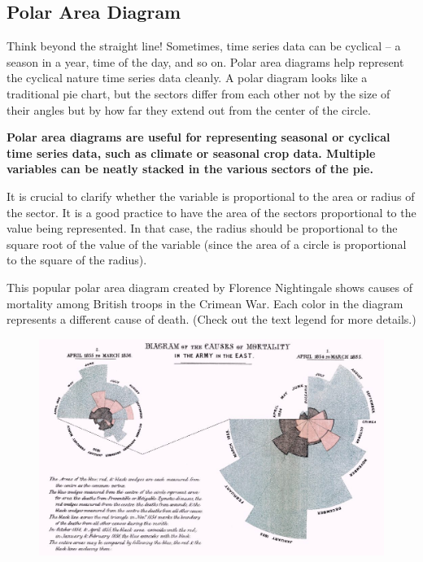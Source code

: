 \documentclass[]{book}
\theoremstyle{definition}
\theoremstyle{definition}
\theoremstyle{definition}
\theoremstyle{remark}
\begin{document}
\subsection{Polar Area Diagram}\label{polar-area-diagram}

Think beyond the straight line! Sometimes, time series data can be
cyclical -- a season in a year, time of the day, and so on. Polar area
diagrams help represent the cyclical nature time series data cleanly. A
polar diagram looks like a traditional pie chart, but the sectors differ
from each other not by the size of their angles but by how far they
extend out from the center of the circle.

\textbf{Polar area diagrams are useful for representing seasonal or
cyclical time series data, such as climate or seasonal crop data.
Multiple variables can be neatly stacked in the various sectors of the
pie.}

It is crucial to clarify whether the variable is proportional to the
area or radius of the sector. It is a good practice to have the area of
the sectors proportional to the value being represented. In that case,
the radius should be proportional to the square root of the value of the
variable (since the area of a circle is proportional to the square of
the radius).

This popular polar area diagram created by Florence Nightingale shows
causes of mortality among British troops in the Crimean War. Each color
in the diagram represents a different cause of death. (Check out the
text legend for more details.)

\begin{figure}
\centering
\includegraphics{images/aya-polar.jpg}
\caption{}
\end{figure}
\end{document}
